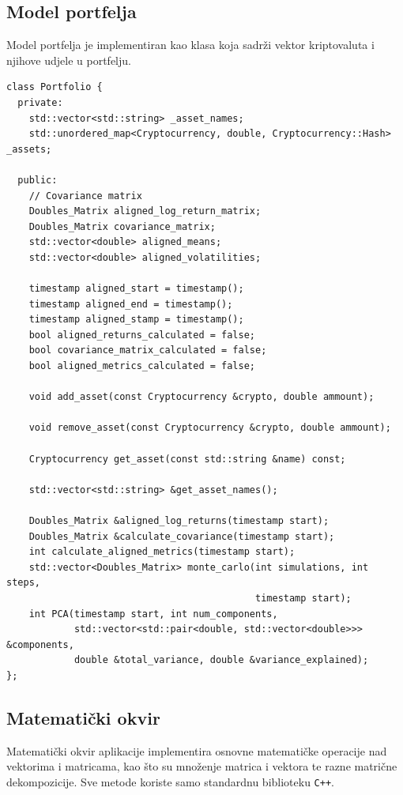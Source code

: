 \documentclass[zavrsnirad, upload]{fer}
\begin{document}
\subsection{Model portfelja}
\label{sek:model_portfelja}
Model portfelja je implementiran kao klasa koja
sadrži vektor kriptovaluta i njihove udjele u portfelju.
\begin{lstlisting}[caption={Model portfelja}, label={lst:portfelj}]
class Portfolio {
  private:
    std::vector<std::string> _asset_names;
    std::unordered_map<Cryptocurrency, double, Cryptocurrency::Hash> _assets;

  public:
    // Covariance matrix
    Doubles_Matrix aligned_log_return_matrix;
    Doubles_Matrix covariance_matrix;
    std::vector<double> aligned_means;
    std::vector<double> aligned_volatilities;

    timestamp aligned_start = timestamp();
    timestamp aligned_end = timestamp();
    timestamp aligned_stamp = timestamp();
    bool aligned_returns_calculated = false;
    bool covariance_matrix_calculated = false;
    bool aligned_metrics_calculated = false;

    void add_asset(const Cryptocurrency &crypto, double ammount);

    void remove_asset(const Cryptocurrency &crypto, double ammount);

    Cryptocurrency get_asset(const std::string &name) const;

    std::vector<std::string> &get_asset_names();

    Doubles_Matrix &aligned_log_returns(timestamp start);
    Doubles_Matrix &calculate_covariance(timestamp start);
    int calculate_aligned_metrics(timestamp start);
    std::vector<Doubles_Matrix> monte_carlo(int simulations, int steps,
                                            timestamp start);
    int PCA(timestamp start, int num_components,
            std::vector<std::pair<double, std::vector<double>>> &components,
            double &total_variance, double &variance_explained);
};
\end{lstlisting}

\subsection{Matematički okvir}
\label{sek:matematicki_okvir}
Matematički okvir aplikacije implementira osnovne matematičke
operacije nad vektorima i matricama, kao što su množenje
matrica i vektora te razne matrične dekompozicije. Sve metode koriste
samo standardnu biblioteku \texttt{C++}.
\end{document}
